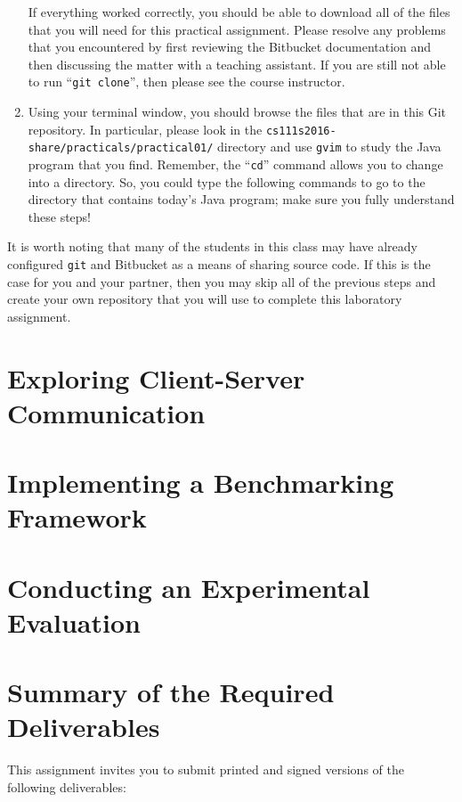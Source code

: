 \begin{enumerate}
    If everything worked correctly, you should be able to download all of the files that you will need for this
    practical assignment. Please resolve any problems that you encountered by first reviewing the Bitbucket
    documentation and then discussing the matter with a teaching assistant.  If you are still not able to run ``{\tt git
      clone}'', then please see the course instructor.

  \item Using your terminal window, you should browse the files that are in this Git repository.  In particular, please
    look in the {\tt cs111s2016-share/practicals/practical01/} directory and use {\tt gvim} to study the Java program that
    you find.  Remember, the ``{\tt cd}'' command allows you to change into a directory. So, you could type the following
    commands to go to the directory that contains today's Java program; make sure you fully understand these steps!

  \end{enumerate}

  It is worth noting that many of the students in this class may have already configured {\tt git} and Bitbucket as a
  means of sharing source code. If this is the case for you and your partner, then you may skip all of the previous
  steps and create your own repository that you will use to complete this laboratory assignment.

\section*{Exploring Client-Server Communication}



\section*{Implementing a Benchmarking Framework}



\section*{Conducting an Experimental Evaluation}



\section*{Summary of the Required Deliverables}

This assignment invites you to submit printed and signed versions of the following deliverables:

